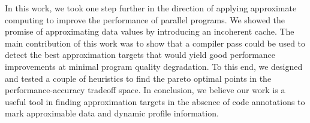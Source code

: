 \documentclass[12pt,conference]{IEEEtran}
\begin{document}
In this work, we took one step further in the direction of applying approximate computing
to improve the performance of parallel programs. We showed the promise of 
approximating data values by introducing an incoherent cache. The main contribution
of this work was to show that a compiler pass could be used to detect the 
best approximation targets that would yield good performance improvements at minimal
program quality degradation. To this end, we designed and tested a couple of 
heuristics to find the pareto optimal points in the performance-accuracy tradeoff space.
In conclusion, we believe our work is a useful tool in finding approximation targets
in the absence of code annotations to mark approximable data and dynamic profile information. 



%
%
\end{document}
